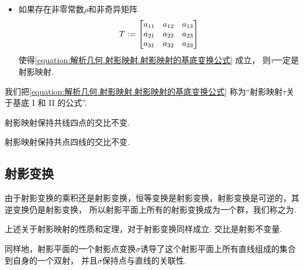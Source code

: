 \begin{theorem}
\begin{itemize}
	\item
	如果存在非零常数\(\rho\)和非奇异矩阵\begin{equation*}
		T
		:=
		\begin{bmatrix}
			a_{11} & a_{12} & a_{13} \\
			a_{21} & a_{22} & a_{23} \\
			a_{31} & a_{32} & a_{33}
		\end{bmatrix}
	\end{equation*}
	使得\cref{equation:解析几何.射影映射.射影映射的基底变换公式} 成立，
	则\(\tau\)一定是射影映射.
\end{itemize}
\end{theorem}

我们把\cref{equation:解析几何.射影映射.射影映射的基底变换公式}
称为“射影映射\(\tau\)关于基底 I 和 II 的公式”.

\begin{property}
射影映射保持共线四点的交比不变.
\end{property}

\begin{property}
射影映射保持共点四线的交比不变.
\end{property}

\subsection{射影变换}
由于射影变换的乘积还是射影变换，恒等变换是射影变换，射影变换是可逆的，其逆变换仍是射影变换，
所以射影平面上所有的射影变换成为一个群，我们称之为.

上述关于射影映射的性质和定理，对于射影变换同样成立.
交比是射影不变量.

同样地，射影平面的一个射影点变换\(\sigma\)诱导了这个射影平面上所有直线组成的集合到自身的一个双射，
并且\(\sigma\)保持点与直线的关联性.

